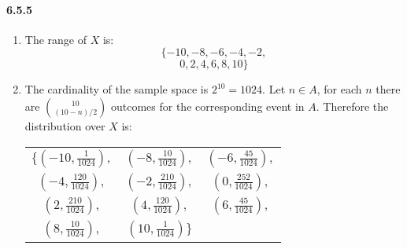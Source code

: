 \documentclass[11pt, letterpaper, twocolumn, fleqn]{article}
\begin{document}
\paragraph{6.5.5}
\begin{enumerate}
  \item The range of $X$ is:
    $$\{-10,-8,-6,-4,-2,$$
    $$0,2,4,6,8,10\}$$
  
  \item The cardinality of the sample space is $2^{10} = 1024$. Let $n \in A$, for each $n$ there are $\binom{10}{(10-n)/2}$ outcomes for the corresponding event in $A$. Therefore the distribution over $X$ is:
  
  \begin{center}
  \begin{tabular}{c c c}
     $\{\left(-10,\frac{1  }{1024} \right),$
      &$\left(-8 ,\frac{10 }{1024} \right),$ 
      &$\left(-6 ,\frac{45 }{1024} \right),$ \\
       $\left(-4 ,\frac{120}{1024} \right),$ 
      &$\left(-2 ,\frac{210}{1024} \right),$ 
      &$\left(0  ,\frac{252}{1024} \right),$ \\
       $\left(2  ,\frac{210}{1024} \right),$
      &$\left(4  ,\frac{120}{1024} \right),$
      &$\left(6  ,\frac{45 }{1024} \right),$ \\
       $\left(8  ,\frac{10 }{1024} \right),$
      &$\left(10 ,\frac{1  }{1024} \right) \}$ 
  \end{tabular}
  \end{center}

\end{enumerate}
\end{document}
